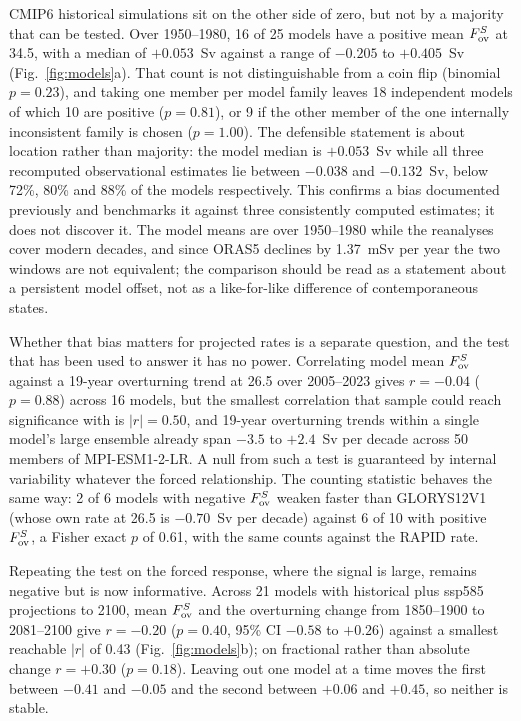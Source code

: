 CMIP6 historical simulations sit on the other side of zero, but not by a
majority that can be tested. Over 1950--1980, 16 of 25 models have a positive
mean $F_{\mathrm{ov}}^{S}$ at 34.5\degS{}, with a median of $+0.053$~Sv against a range of
$-0.205$ to $+0.405$~Sv (Fig.~\ref{fig:models}a). That count is not
distinguishable from a coin flip (binomial $p=0.23$), and taking one member per
model family leaves 18 independent models of which 10 are positive
($p=0.81$), or 9 if the other member of the one internally inconsistent family
is chosen ($p=1.00$). The defensible statement is about location rather than
majority: the model median is $+0.053$~Sv while all three recomputed
observational estimates lie between $-0.038$ and $-0.132$~Sv, below 72\%, 80\%
and 88\% of the models respectively. This confirms a bias documented
previously\cite{Mecking2017,vanWestenDijkstra2024,Weijer2019} and benchmarks it
against three consistently computed estimates; it does not discover it. The
model means are over 1950--1980 while the reanalyses cover modern decades, and
since ORAS5 declines by 1.37~mSv per year the two windows are not equivalent;
the comparison should be read as a statement about a persistent model offset,
not as a like-for-like difference of contemporaneous states.

Whether that bias matters for projected rates is a separate question, and the
test that has been used to answer it has no power. Correlating model mean
$F_{\mathrm{ov}}^{S}$ against a 19-year overturning trend at 26.5\degN{} over 2005--2023
gives $r=-0.04$ ($p=0.88$) across 16 models, but the smallest correlation that
sample could reach significance with is $|r|=0.50$, and 19-year overturning
trends within a single model's large ensemble already span $-3.5$ to
$+2.4$~Sv per decade across 50 members of MPI-ESM1-2-LR. A null from such a test
is guaranteed by internal variability whatever the forced relationship. The
counting statistic behaves the same way: 2 of 6 models with negative $F_{\mathrm{ov}}^{S}$
weaken faster than GLORYS12V1 (whose own rate at 26.5\degN{} is $-0.70$~Sv per
decade) against 6 of 10 with positive $F_{\mathrm{ov}}^{S}$, a Fisher exact $p$ of 0.61, with the same counts against the RAPID rate.

Repeating the test on the forced response, where the signal is large, remains
negative but is now informative. Across 21 models with historical plus ssp585
projections to 2100, mean $F_{\mathrm{ov}}^{S}$ and the overturning change from 1850--1900 to
2081--2100 give $r=-0.20$ ($p=0.40$, 95\% CI $-0.58$ to $+0.26$) against a
smallest reachable $|r|$ of 0.43 (Fig.~\ref{fig:models}b); on fractional rather
than absolute change $r=+0.30$ ($p=0.18$). Leaving out one model at a time
moves the first between $-0.41$ and $-0.05$ and the second between $+0.06$ and
$+0.45$, so neither is stable.

